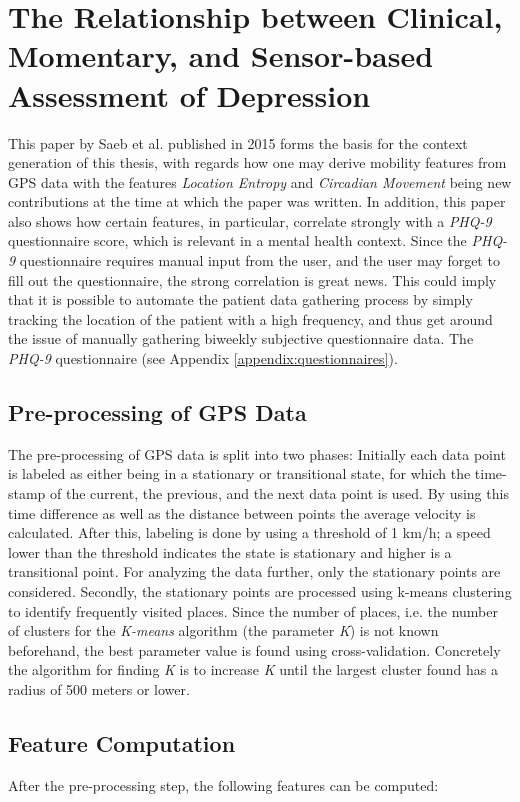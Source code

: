 \section{The Relationship between Clinical, Momentary, and Sensor-based Assessment of Depression}
This paper by Saeb et al. published in 2015 \cite{Saeb2015} forms the basis for the context generation of this thesis, with regards how one may derive mobility features from GPS data with the features \textit{Location Entropy} and \textit{Circadian Movement} being new contributions at the time at which the paper was written. In addition, this paper also shows how certain features, in particular, correlate strongly with a \textit{PHQ-9} questionnaire score, which is relevant in a mental health context. Since the \textit{PHQ-9} questionnaire requires manual input from the user, and the user may forget to fill out the questionnaire, the strong correlation is great news. This could imply that it is possible to automate the patient data gathering process by simply tracking the location of the patient with a high frequency, and thus get around the issue of manually gathering biweekly subjective questionnaire data. The \textit{PHQ-9} questionnaire (see Appendix \ref{appendix:questionnaires}).

\subsection{Pre-processing of GPS Data}
The pre-processing of GPS data is split into two phases: Initially each data point is labeled as either being in a stationary or transitional state, for which the time-stamp of the current, the previous, and the next data point is used. By using this time difference as well as the distance between points the average velocity is calculated. After this, labeling is done by using a threshold of 1 km/h; a speed lower than the threshold indicates the state is stationary and higher is a transitional point. For analyzing the data further, only the stationary points are considered. Secondly, the stationary points are processed using k-means clustering to identify frequently visited places. Since the number of places, i.e. the number of clusters for the \textit{K-means} algorithm (the parameter \textit{K}) is not known beforehand, the best parameter value is found using cross-validation. Concretely the algorithm for finding \textit{K} is to increase \textit{K} until the largest cluster found has a radius of 500 meters or lower.

\subsection{Feature Computation}
\label{ref:features-saeb2015}
After the pre-processing step, the following features can be computed:\\

